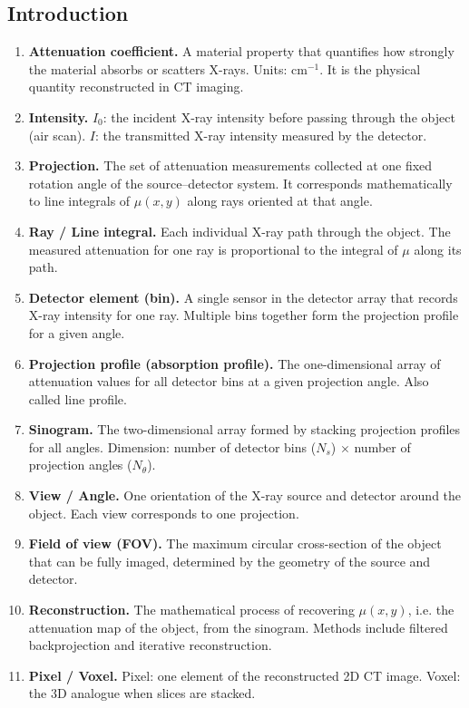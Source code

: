\documentclass[../../../main.tex]{subfiles}
\begin{document}
\subsection{Introduction}
\begin{enumerate}
    \item \textbf{Attenuation coefficient.} A material property that quantifies how strongly the material absorbs or scatters X-rays. Units: $\text{cm}^{-1}$. It is the physical quantity reconstructed in CT imaging.
    \item \textbf{Intensity.} $I_0$: the incident X-ray intensity before passing through the object (air scan).  $I$: the transmitted X-ray intensity measured by the detector.
    \item \textbf{Projection.} The set of attenuation measurements collected at one fixed rotation angle of the source--detector system. It corresponds mathematically to line integrals of $\mu(x,y)$ along rays oriented at that angle.
    \item \textbf{Ray / Line integral.} Each individual X-ray path through the object. The measured attenuation for one ray is proportional to the integral of $\mu$ along its path.
    \item \textbf{Detector element (bin).} A single sensor in the detector array that records X-ray intensity for one ray. Multiple bins together form the projection profile for a given angle.
    \item \textbf{Projection profile (absorption profile).} The one-dimensional array of attenuation values for all detector bins at a given projection angle. Also called line profile.
    \item \textbf{Sinogram.} The two-dimensional array formed by stacking projection profiles for all angles. Dimension: number of detector bins ($N_s$) $\times$ number of projection angles ($N_\theta$).
    \item \textbf{View / Angle.} One orientation of the X-ray source and detector around the object. Each view corresponds to one projection.
    \item \textbf{Field of view (FOV).} The maximum circular cross-section of the object that can be fully imaged, determined by the geometry of the source and detector.
    \item \textbf{Reconstruction.} The mathematical process of recovering $\mu(x,y)$, i.e. the attenuation map of the object, from the sinogram. Methods include filtered backprojection and iterative reconstruction.
    \item \textbf{Pixel / Voxel.} Pixel: one element of the reconstructed 2D CT image. Voxel: the 3D analogue when slices are stacked.
\end{enumerate}
\end{document}
